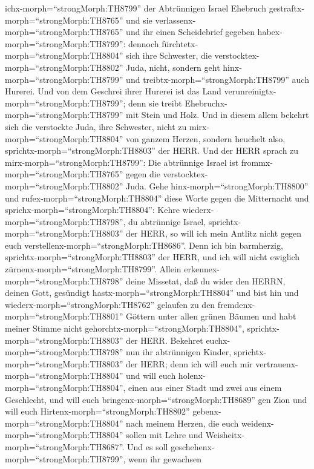 ichx-morph=``strongMorph:TH8799'' der Abtrünnigen Israel Ehebruch
gestraftx-morph=``strongMorph:TH8765'' und sie
verlassenx-morph=``strongMorph:TH8765'' und ihr einen Scheidebrief
gegeben habex-morph=``strongMorph:TH8799'': dennoch
fürchtetx-morph=``strongMorph:TH8804'' sich ihre Schwester, die
verstocktex-morph=``strongMorph:TH8802'' Juda, nicht, sondern geht
hinx-morph=``strongMorph:TH8799'' und
treibtx-morph=``strongMorph:TH8799'' auch Hurerei.  Und von
dem Geschrei ihrer Hurerei ist das Land
verunreinigtx-morph=``strongMorph:TH8799''; denn sie treibt
Ehebruchx-morph=``strongMorph:TH8799'' mit Stein und Holz. 
Und in diesem allem bekehrt sich die verstockte Juda, ihre Schwester,
nicht zu mirx-morph=``strongMorph:TH8804'' von ganzem Herzen, sondern
heuchelt also, sprichtx-morph=``strongMorph:TH8803'' der HERR.
 Und der HERR sprach zu mirx-morph=``strongMorph:TH8799'':
Die abtrünnige Israel ist frommx-morph=``strongMorph:TH8765'' gegen die
verstocktex-morph=``strongMorph:TH8802'' Juda.  Gehe
hinx-morph=``strongMorph:TH8800'' und rufex-morph=``strongMorph:TH8804''
diese Worte gegen die Mitternacht und
sprichx-morph=``strongMorph:TH8804'': Kehre
wiederx-morph=``strongMorph:TH8798'', du abtrünnige Israel,
sprichtx-morph=``strongMorph:TH8803'' der HERR, so will ich mein Antlitz
nicht gegen euch verstellenx-morph=``strongMorph:TH8686''. Denn ich bin
barmherzig, sprichtx-morph=``strongMorph:TH8803'' der HERR, und ich will
nicht ewiglich zürnenx-morph=``strongMorph:TH8799''. 
Allein erkennex-morph=``strongMorph:TH8798'' deine Missetat, daß du
wider den HERRN, deinen Gott, gesündigt
hastx-morph=``strongMorph:TH8804'' und bist hin und
wiederx-morph=``strongMorph:TH8762'' gelaufen zu den
fremdenx-morph=``strongMorph:TH8801'' Göttern unter allen grünen Bäumen
und habt meiner Stimme nicht gehorchtx-morph=``strongMorph:TH8804'',
sprichtx-morph=``strongMorph:TH8803'' der HERR.  Bekehret
euchx-morph=``strongMorph:TH8798'' nun ihr abtrünnigen Kinder,
sprichtx-morph=``strongMorph:TH8803'' der HERR; denn ich will euch mir
vertrauenx-morph=``strongMorph:TH8804'' und will euch
holenx-morph=``strongMorph:TH8804'', einen aus einer Stadt und zwei aus
einem Geschlecht, und will euch bringenx-morph=``strongMorph:TH8689''
gen Zion  und will euch
Hirtenx-morph=``strongMorph:TH8802'' gebenx-morph=``strongMorph:TH8804''
nach meinem Herzen, die euch weidenx-morph=``strongMorph:TH8804'' sollen
mit Lehre und Weisheitx-morph=``strongMorph:TH8687''.  Und
es soll geschehenx-morph=``strongMorph:TH8799'', wenn ihr gewachsen
